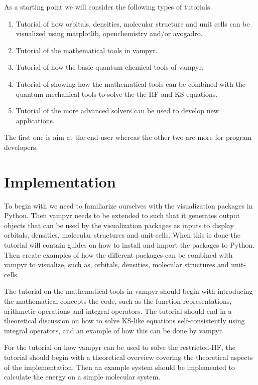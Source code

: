 \documentclass[12pt]{article}
\begin{document}
As a starting point we will consider the following types of tutorials.

\begin{enumerate}
    \item Tutorial of how orbitals, densities, molecular structure and unit cells
    can be visualized using matplotlib, openchemistry and/or avogadro.
    \item Tutorial of the mathematical tools in \ac{vampyr}.
    \item Tutorial of how the basic quantum chemical tools of \ac{vampyr}.
    \item Tutorial of showing how the mathematical tools can be combined
    with the quantum mechanical tools to solve the
    the \ac{HF} and \ac{KS} equations.
    \item Tutorial of the more advanced solvers can be used to develop new
    applications.
\end{enumerate}

The first one is aim at the end-user whereas the other two are more
for program developers.

\section{Implementation}

To begin with we need to familiarize ourselves with the visualization packages in
Python.
Then \ac{vampyr} needs to be extended to such that it generates output objects
that can be used by the visualization packages as inputs to display orbitals,
densities, molecular structures and unit-cells. When this is done the tutorial
will contain guides on how to install and import the packages to Python.
Then create examples of how the different
packages can be combined with \ac{vampyr} to visualize, such as, orbitals,
densities, molecular structures and unit-cells.

The tutorial on the mathematical tools in \ac{vampyr} should begin
with introducing the mathematical concepts the code, such as
the function representations, arithmetic operations and integral
operators. The tutorial should end in a theoretical discussion
on how to solve \ac{KS}-like equations self-consistently using
integral operators, and an example of how this can be done
by \ac{vampyr}.

For the tutorial on how \ac{vampyr} can be used to solve the restricted-\ac{HF},
the tutorial should begin with a theoretical overview covering the theoretical
aspects of the implementation. Then an example system should be implemented
to calculate the energy on a simple molecular system.
\end{document}
